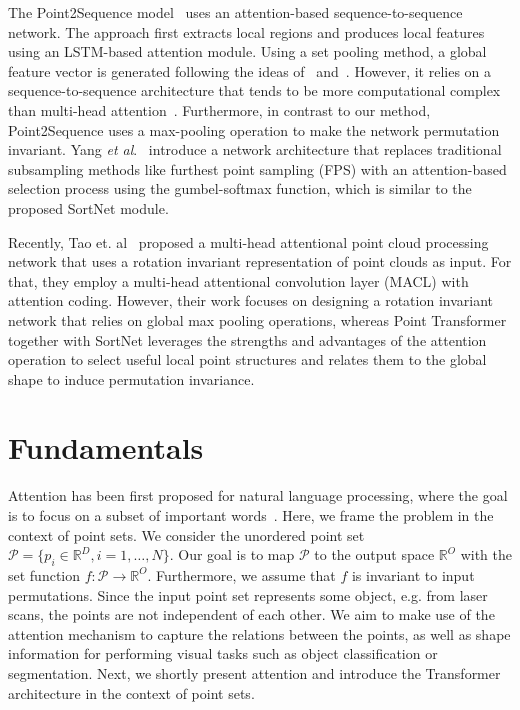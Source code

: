 \documentclass{ieeeaccess}
\begin{document}
The Point2Sequence model~\cite{liu2019point2sequence} uses an attention-based sequence-to-sequence network. The approach first extracts local regions and produces local features using an LSTM-based attention module. Using a set pooling method, a global feature vector is generated following the ideas of~\cite{zaheer2017deep} and~\cite{qi2017pointnet}. However, it relies on a sequence-to-sequence architecture that tends to be more computational complex than multi-head attention~\cite{vaswani2017attention}. Furthermore, in contrast to our method, Point2Sequence uses a max-pooling operation to make the network permutation invariant. 
Yang \textit{et al}.~\cite{yang2019modeling} introduce a network architecture that replaces traditional subsampling methods like furthest point sampling (FPS) with an attention-based selection process using the gumbel-softmax function, which is similar to the proposed SortNet module.

Recently, Tao et. al~\cite{9427563} proposed a multi-head attentional point cloud processing network that uses a rotation invariant representation of point clouds as input. For that, they employ a multi-head attentional convolution layer (MACL) with attention coding. However, their work focuses on designing a rotation invariant network that relies on global max pooling operations, whereas Point Transformer together with SortNet leverages the strengths and advantages of the attention operation to select useful local point structures and relates them to the global shape to induce permutation invariance.

\section{Fundamentals}\label{seq:03_fundamentals}
Attention has been first proposed for natural language processing, where the goal is to focus on a subset of important words~\cite{bahdanau2014neural}. Here, we frame the problem in the context of point sets. We consider the unordered point set \mbox{$\mathcal{P}=\{ p_i \in \mathbb{R}^{D}, i = 1, \dots, N\}$.} Our goal is to map $\mathcal{P}$ to the output space $\mathbb{R}^O$ with the set function $f:\mathcal{P} \rightarrow \mathbb{R}^O$. Furthermore, we assume that $f$ is invariant to input permutations.
Since the input point set represents some object, e.g. from laser scans, the points are not independent of each other.
We aim to make use of the attention mechanism to capture the relations between the points, as well as shape information for performing visual tasks such as object classification or segmentation. 
Next, we shortly present attention and introduce the Transformer architecture in the context of point sets.
\end{document}

